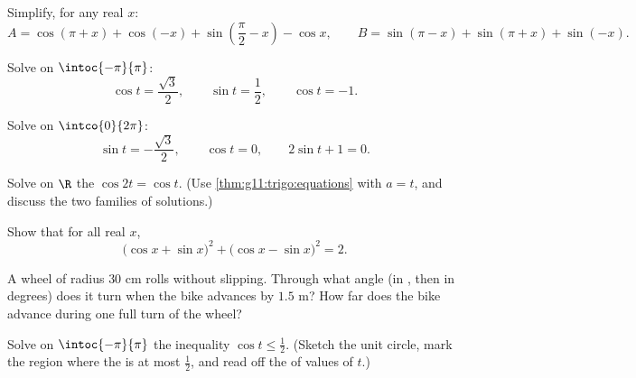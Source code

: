 \begin{exercise}[$\star\star$]\label{exo:g11:trigo:5}
Simplify, for any real $x$:
\[
A = \cos(\pi + x) + \cos(-x) + \sin\left(\frac\pi2 - x\right) - \cos x,
\qquad
B = \sin(\pi - x) + \sin(\pi + x) + \sin(-x) .
\]
\end{exercise}

\begin{exercise}[$\star\star$]\label{exo:g11:trigo:6}
Solve on $\intoc{-\pi}{\pi}$:
\[
\cos t = \frac{\sqrt3}{2}, \qquad
\sin t = \frac12, \qquad
\cos t = -1 .
\]
\end{exercise}

\begin{exercise}[$\star\star$]\label{exo:g11:trigo:7}
Solve on $\intco{0}{2\pi}$:
\[
\sin t = -\frac{\sqrt3}{2}, \qquad
\cos t = 0, \qquad
2\sin t + 1 = 0 .
\]
\end{exercise}

\begin{exercise}[$\star\star$]\label{exo:g11:trigo:8}
Solve on $\R$ the  $\cos 2t = \cos t$. (Use
\cref{thm:g11:trigo:equations} with $a = t$, and discuss the two families
of solutions.)
\end{exercise}

\begin{exercise}[$\star\star$]\label{exo:g11:trigo:9}
Show that for all real $x$,
\[
\bigl(\cos x + \sin x\bigr)^2 + \bigl(\cos x - \sin x\bigr)^2 = 2 .
\]
\end{exercise}

\begin{exercise}[$\star\star$]\label{exo:g11:trigo:10}
A wheel of radius $30$ cm rolls without slipping. Through what angle (in
, then in degrees) does it turn when the bike advances by $1.5$ m?
How far does the bike advance during one full turn of the wheel?
\end{exercise}

\begin{exercise}[$\star\star\star$]\label{exo:g11:trigo:11}
Solve on $\intoc{-\pi}{\pi}$ the inequality
$\cos t \leq \frac12$. (Sketch the unit circle, mark the region where the
 is at most $\frac12$, and read off the  of values of
$t$.)
\end{exercise}
